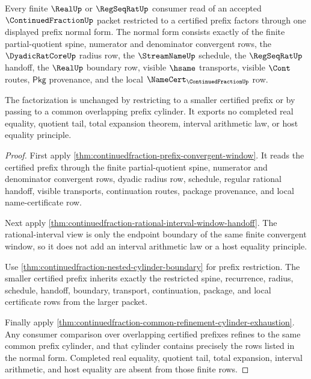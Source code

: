 \begin{theorem}
\label{thm:continuedfraction-convergent-prefix-window-normal-form}
Every finite $\RealUp$ or $\RegSeqRatUp$ consumer read of an accepted
$\ContinuedFractionUp$ packet restricted to a certified prefix factors through
one displayed prefix normal form. The normal form consists exactly of the
finite partial-quotient spine, numerator and denominator convergent rows, the
$\DyadicRatCoreUp$ radius row, the $\StreamNameUp$ schedule, the
$\RegSeqRatUp$ handoff, the $\RealUp$ boundary row, visible $\hsame$
transports, visible $\Cont$ routes, $\mathsf{Pkg}$ provenance, and the local
$\NameCert_{\ContinuedFractionUp}$ row.

The factorization is unchanged by restricting to a smaller certified prefix
or by passing to a common overlapping prefix cylinder. It exports no completed
real equality, quotient tail, total expansion theorem, interval arithmetic
law, or host equality principle.
\end{theorem}
\begin{proof}
First apply \autoref{thm:continuedfraction-prefix-convergent-window}. It reads
the certified prefix through the finite partial-quotient spine, numerator and
denominator convergent rows, dyadic radius row, schedule, regular rational
handoff, visible transports, continuation routes, package provenance, and
local name-certificate row.

Next apply
\autoref{thm:continuedfraction-rational-interval-window-handoff}. The
rational-interval view is only the endpoint boundary of the same finite
convergent window, so it does not add an interval arithmetic law or a host
equality principle.

Use \autoref{thm:continuedfraction-nested-cylinder-boundary} for prefix
restriction. The smaller certified prefix inherits exactly the restricted
spine, recurrence, radius, schedule, handoff, boundary, transport,
continuation, package, and local certificate rows from the larger packet.

Finally apply
\autoref{thm:continuedfraction-common-refinement-cylinder-exhaustion}. Any
consumer comparison over overlapping certified prefixes refines to the same
common prefix cylinder, and that cylinder contains precisely the rows listed
in the normal form. Completed real equality, quotient tail, total expansion,
interval arithmetic, and host equality are absent from those finite rows.
\end{proof}

